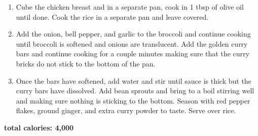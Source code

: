 \documentclass{report}
\begin{document}
\begin{multicols}{2}
\begin{enumerate}
\medskip
\item Cube the chicken breast and in a separate pan, cook in 1 tbsp of olive oil until done. Cook the rice in a separate pan and leave covered.
\medskip

\item Add the onion, bell pepper, and garlic to the broccoli and continue cooking until broccoli is softened and onions are translucent. Add the golden curry bars and continue cooking for a couple minutes making sure that the curry bricks do not stick to the bottom of the pan.
\newline 

 \item Once the bars have softened, add water and stir until sauce is thick but the curry bars have dissolved. Add bean sprouts and bring to a boil stirring well and making sure nothing is sticking to the bottom. Season with red pepper flakes, ground ginger, and extra curry powder to taste. Serve over rice.  
\end{enumerate}
\end{multicols}

\begin{centering}
\Large{\textbf{total calories: 4,000}}

\end{centering}
\end{document}

